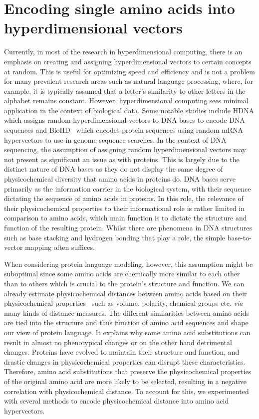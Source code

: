 \section{Encoding single amino acids into hyperdimensional vectors}
Currently, in most of the research in hyperdimensional computing, there is an emphasis on creating and assigning hyperdimensional vectors to certain concepts at random. This is useful for optimizing speed and efficiency and is not a problem for many prevalent research areas such as natural language processing, where, for example, it is typically assumed that a letter's similarity to other letters in the alphabet remains constant. However, hyperdimensional computing sees minimal application in the context of biological data. Some notable studies include HDNA which assigns random hyperdimensional vectors to DNA bases to encode DNA sequences and BioHD~\cite{biohd} which encodes protein sequences using random mRNA hypervectors to use in genome sequence searches. In the context of DNA sequencing, the assumption of assigning random hyperdimensional vectors may not present as significant an issue as with proteins. This is largely due to the distinct nature of DNA bases as they do not display the same degree of physicochemical diversity that amino acids in proteins do. DNA bases serve primarily as the information carrier in the biological system, with their sequence dictating the sequence of amino acids in proteins. In this role, the relevance of their physicochemical properties to their informational role is rather limited in comparison to amino acids, which main function is to dictate the structure and function of the resulting protein. Whilst there are phenomena in DNA structures such as base stacking and hydrogen bonding that play a role, the simple base-to-vector mapping often suffices.

When considering protein language modeling, however, this assumption might be suboptimal since some amino acids are chemically more similar to each other than to others which is crucial to the protein's structure and function. We can already estimate physicochemical distances between amino acids based on their physicochemical properties~\cite{physicochem} such as volume, polarity, chemical groups etc. \textit{via} many kinds of distance measures. The different similarities between amino acids are tied into the structure and thus function of amino acid sequences and shape our view of protein language. It explains why some amino acid substitutions can result in almost no phenotypical changes or on the other hand detrimental changes. Proteins have evolved to maintain their structure and function, and drastic changes in physicochemical properties can disrupt these characteristics. Therefore, amino acid substitutions that preserve the physicochemical properties of the original amino acid are more likely to be selected, resulting in a negative correlation with physicochemical distance. To account for this, we experimented with several methods to encode physicochemical distance into amino acid hypervectors.

